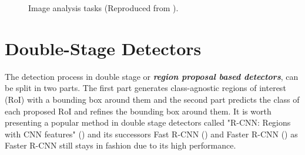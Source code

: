 \begin{figure}[!htb]
  \centering
  
  \caption{Image analysis tasks (Reproduced from \cite{garcia1704review}).}
  \label{fig1}
\end{figure}

\section{Double-Stage Detectors}

The detection process in double stage or \textbf{\textit{region proposal based detectors}}, can be split in two parts. The first part generates class-agnostic regions of interest (RoI) with a bounding box around them and the second part predicts the class of each proposed RoI and refines the bounding box around them. It is worth presenting a popular method in double stage detectors called "R-CNN: Regions with CNN features" (\cite{girshick2014rich}) and its successors Fast R-CNN (\cite{girshick2015fast}) and Faster R-CNN (\cite{ren2015faster}) as Faster R-CNN still stays in fashion due to its high performance.

